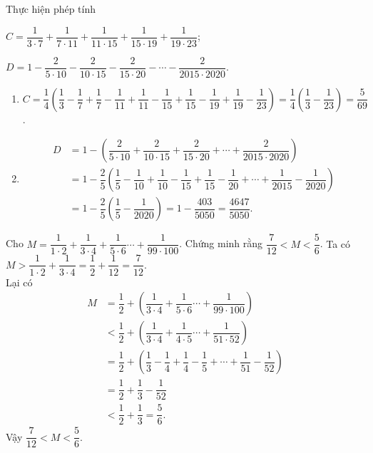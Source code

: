 \begin{vd}
	Thực hiện phép tính
	\begin{listEX}[1]
		\item $C= \dfrac{1}{3 \cdot 7}+\dfrac{1}{7 \cdot 11}+ \dfrac{1}{11 \cdot 15}+ \dfrac{1}{15 \cdot 19}+ \dfrac{1}{19 \cdot 23}$;
		\item $D= 1 - \dfrac{2}{5 \cdot 10} - \dfrac{2}{10 \cdot 15} - \dfrac{2}{15 \cdot 20} - \cdots - \dfrac{2}{2015 \cdot 2020} $. 
	\end{listEX}
	\loigiai
	{\begin{enumerate}
			\item $C= \dfrac{1}{4} \left( \dfrac{1}{3}- \dfrac{1}{7} + \dfrac{1}{7}-\dfrac{1}{11}+\dfrac{1}{11} -\dfrac{1}{15} + \dfrac{1}{15}- \dfrac{1}{19} + \dfrac{1}{19} - \dfrac{1}{23}\right) = \dfrac{1}{4} \left( \dfrac{1}{3} - \dfrac{1}{23} \right) = \dfrac{5}{69} $.
			\item \begin{align*}
			D&= 1 - \left( \dfrac{2}{5 \cdot 10} + \dfrac{2}{10 \cdot 15} + \dfrac{2}{15 \cdot 20} + \cdots + \dfrac{2}{2015 \cdot 2020} \right) \\
			&= 1- \dfrac{2}{5} \left(   \dfrac{1}{5}- \dfrac{1}{10} + \dfrac{1}{10}-\dfrac{1}{15}+\dfrac{1}{15} -\dfrac{1}{20}+ \cdots + \dfrac{1}{2015}- \dfrac{1}{2020}\right) \\
			&= 1 - \dfrac{2}{5} \left( \dfrac{1}{5} -  \dfrac{1}{2020} \right) 
			= 1 - \dfrac{403}{5050} = \dfrac{4647}{5050}.
			\end{align*} 
		\end{enumerate}
	}
\end{vd}

\begin{vd}
Cho $M=\dfrac{1}{1 \cdot 2}+ \dfrac{1}{3 \cdot 4} + \dfrac{1}{ 5 \cdot 6} \cdots + \dfrac{1}{99 \cdot 100} $. Chứng minh rằng $\dfrac{7}{12} < M < \dfrac{5}{6}$.
	\loigiai
	{Ta có $M > \dfrac{1}{1 \cdot 2}+ \dfrac{1}{3 \cdot 4}  = \dfrac{1}{2} + \dfrac{1}{12} = \dfrac{7}{12}$.\\
	Lại có
\begin{align*}
M &= \dfrac{1}{2} + \left(   \dfrac{1}{3 \cdot 4} + \dfrac{1}{ 5 \cdot 6} \cdots + \dfrac{1}{99 \cdot 100} \right) \\
&< \dfrac{1}{2} + \left(   \dfrac{1}{3 \cdot 4} + \dfrac{1}{ 4 \cdot 5} \cdots + \dfrac{1}{51 \cdot 52} \right) \\
&= \dfrac{1}{2} + \left( \dfrac{1}{3}- \dfrac{1}{4} + \dfrac{1}{4}-\dfrac{1}{5} + \cdots + \dfrac{1}{51} - \dfrac{1}{52}\right) \\
&= \dfrac{1}{2} + \dfrac{1}{3} - \dfrac{1}{52}\\
&< \dfrac{1}{2} + \dfrac{1}{3} = \dfrac{5}{6}.
\end{align*}
Vậy $\dfrac{7}{12} < M < \dfrac{5}{6}$.
	}
\end{vd}

